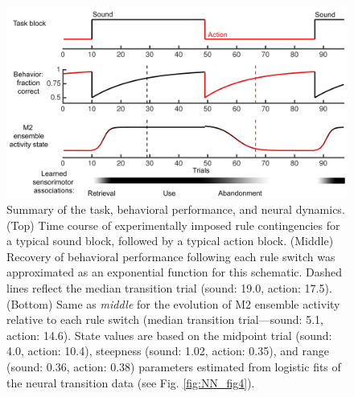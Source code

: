 \begin{figure}[htbp]

\begin{center}
\includegraphics[width=\textwidth]{Figures/Chapter3/NN_figS9.jpg} 
\end{center}

\caption[Summary of the task, behavioral performance, and neural dynamics]
{Summary of the task, behavioral performance, and neural dynamics. (Top) Time course of experimentally imposed rule contingencies for a typical sound block, followed by a typical action block. (Middle) Recovery of behavioral performance following each rule switch was approximated as an exponential function for this schematic. Dashed lines reflect the median transition trial (sound: 19.0, action: 17.5). (Bottom) Same as \emph{middle} for the evolution of M2 ensemble activity relative to each rule switch (median transition trial---sound: 5.1, action: 14.6). State values are based on the midpoint trial (sound: 4.0, action: 10.4), steepness (sound: 1.02, action: 0.35), and range (sound: 0.36, action: 0.38) parameters estimated from logistic fits of the neural transition data (see Fig. \ref{fig:NN_fig4}).
}

\label{fig:NN_figS9}
\end{figure}